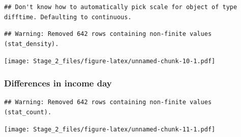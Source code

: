 \documentclass[]{article}
\newenvironment{Shaded}{\begin{snugshade}}{\end{snugshade}}
\newcommand{\KeywordTok}[1]{\textcolor[rgb]{0.13,0.29,0.53}{\textbf{#1}}}
\newcommand{\DataTypeTok}[1]{\textcolor[rgb]{0.13,0.29,0.53}{#1}}
\newcommand{\StringTok}[1]{\textcolor[rgb]{0.31,0.60,0.02}{#1}}
\newcommand{\OperatorTok}[1]{\textcolor[rgb]{0.81,0.36,0.00}{\textbf{#1}}}
\newcommand{\NormalTok}[1]{#1}
\begin{document}
\begin{verbatim}
## Don't know how to automatically pick scale for object of type difftime. Defaulting to continuous.
\end{verbatim}

\begin{verbatim}
## Warning: Removed 642 rows containing non-finite values (stat_density).
\end{verbatim}

\texttt{[image: Stage\_2\_files/figure-latex/unnamed-chunk-10-1.pdf]}

\subsubsection{Differences in income
day}\label{differences-in-income-day}

\begin{Shaded}
\end{Shaded}

\begin{verbatim}
## Warning: Removed 642 rows containing non-finite values (stat_count).
\end{verbatim}

\texttt{[image: Stage\_2\_files/figure-latex/unnamed-chunk-11-1.pdf]}

\begin{Shaded}
\end{Shaded}
\end{document}
